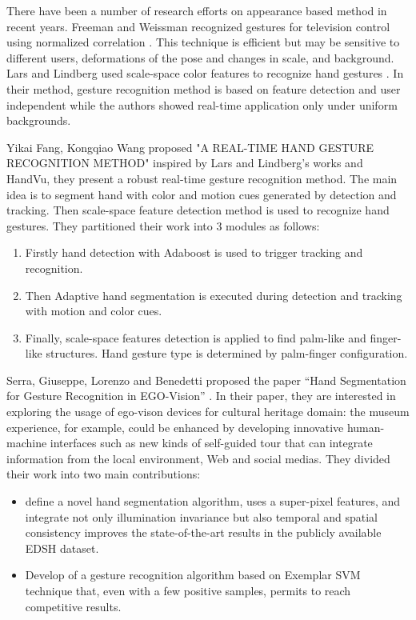 \bigskip



There have been a number of research efforts on appearance based method in recent years. Freeman and Weissman recognized gestures for television control using normalized correlation \cite{relatedsg3}. This technique is efficient but may be sensitive to different users, deformations of the pose and changes in scale, and background. Lars and Lindberg used scale-space color features to recognize hand gestures \cite{relatedsg4}. In their method, gesture recognition method is based on feature detection and user independent while the authors showed real-time application only under uniform backgrounds.
\bigskip

Yikai Fang, Kongqiao Wang proposed "A REAL-TIME HAND GESTURE RECOGNITION METHOD" \cite{relatedsg5} inspired by Lars and Lindberg’s works and HandVu, they present a robust real-time gesture recognition method. The main idea is to segment hand with color and motion cues generated by detection and tracking. Then scale-space feature detection method is used to recognize hand gestures. They partitioned their work into 3 modules as follows:\bigskip
\begin{enumerate}
\item  Firstly hand detection with Adaboost is used to trigger tracking and recognition.
\item Then Adaptive hand segmentation is executed during detection and tracking with motion and color cues.
\item  Finally, scale-space features detection is applied to find palm-like and finger-like structures. Hand gesture type is determined by palm-finger configuration.
\end{enumerate}
\bigskip

Serra, Giuseppe, Lorenzo and Benedetti proposed the paper “Hand Segmentation for Gesture Recognition in EGO-Vision” \cite{relatedsg6}. In their paper, they are interested in exploring the usage of ego-vison devices for cultural heritage domain: the museum experience, for example, could be enhanced by developing innovative human-machine interfaces such as new kinds of self-guided tour that can integrate information from the local environment, Web and social medias.
They divided their work into two main contributions:
\bigskip

\begin{itemize}
\item define a novel hand segmentation algorithm, uses a super-pixel features, and integrate not only illumination invariance but also temporal and spatial consistency improves the state-of-the-art results in the publicly available EDSH dataset.
\item Develop of a gesture recognition algorithm based on Exemplar SVM technique that, even with a few positive samples, permits to reach competitive results.
\end{itemize}
\bigskip


